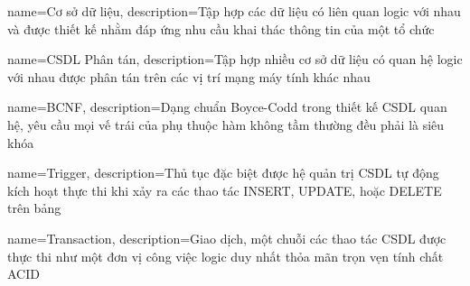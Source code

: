 {
    name=Cơ sở dữ liệu,
    description={Tập hợp các dữ liệu có liên quan logic với nhau và được thiết kế nhằm đáp ứng nhu cầu khai thác thông tin của một tổ chức}
}

{
    name=CSDL Phân tán,
    description={Tập hợp nhiều cơ sở dữ liệu có quan hệ logic với nhau được phân tán trên các vị trí mạng máy tính khác nhau}
}

{
    name=BCNF,
    description={Dạng chuẩn Boyce-Codd trong thiết kế CSDL quan hệ, yêu cầu mọi vế trái của phụ thuộc hàm không tầm thường đều phải là siêu khóa}
}

{
    name=Trigger,
    description={Thủ tục đặc biệt được hệ quản trị CSDL tự động kích hoạt thực thi khi xảy ra các thao tác INSERT, UPDATE, hoặc DELETE trên bảng}
}

{
    name=Transaction,
    description={Giao dịch, một chuỗi các thao tác CSDL được thực thi như một đơn vị công việc logic duy nhất thỏa mãn trọn vẹn tính chất ACID}
}

